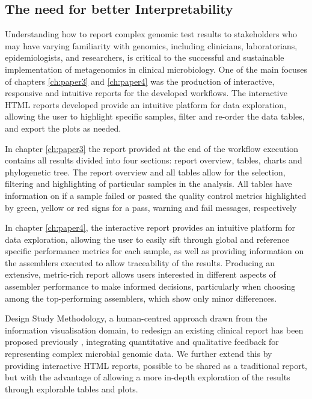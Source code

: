\subsection{The need for better Interpretability}

Understanding how to report complex genomic test results to stakeholders who may have varying familiarity with genomics, including clinicians, laboratorians, epidemiologists, and researchers, is critical to the successful and sustainable implementation of metagenomics in clinical microbiology. One of the main focuses of chapters \ref{ch:paper3} and \ref{ch:paper4} was the production of interactive, responsive and intuitive reports for the developed workflows. The interactive HTML reports developed provide an intuitive platform for data exploration, allowing the user to highlight specific samples, filter and re-order the data tables, and export the plots as needed. 

In chapter \ref{ch:paper3} the report provided at the end of the workflow execution contains all results divided into four sections: report overview, tables, charts and phylogenetic tree. The report overview and all tables allow for the selection, filtering and highlighting of particular samples in the analysis. All tables have information on if a sample failed or passed the quality control metrics highlighted by green, yellow or red signs for a pass, warning and fail messages, respectively

In chapter \ref{ch:paper4}, the interactive report provides an intuitive platform for data exploration, allowing the user to easily sift through global and reference specific performance metrics for each sample, as well as providing information on the assemblers executed to allow traceability of the results. Producing an extensive, metric-rich report allows users interested in different aspects of assembler performance to make informed decisions, particularly when choosing among the top-performing assemblers, which show only minor differences.

Design Study Methodology, a human-centred approach drawn from the information visualisation domain, to redesign an existing clinical report has been proposed previously \citep{crisan_evidence-based_2018}, integrating quantitative and qualitative feedback for representing complex microbial genomic data. We further extend this by providing interactive HTML reports, possible to be shared as a traditional report, but with the advantage of allowing a more in-depth exploration of the results through explorable tables and plots. 

